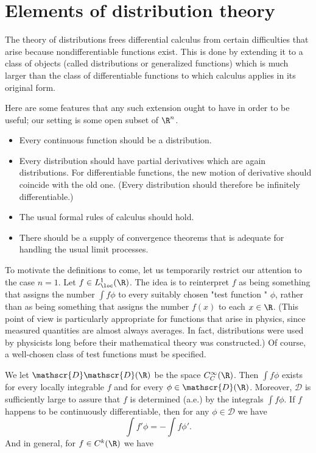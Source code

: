 \chapter{Elements of distribution theory}
The theory of distributions frees differential calculus from certain difficulties that arise because nondifferentiable functions exist. This is done by extending it to a class of objects (called distributions or generalized functions) which is much larger than the class of differentiable functions to which calculus applies in its original form.\par
Here are some features that any such extension ought to have in order to be useful; our setting is some open subset of $\R^n$.
\begin{itemize}
\item Every continuous function should be a distribution.
\item Every distribution should have partial derivatives which are again distributions. For differentiable functions, the new motion of derivative
should coincide with the old one. (Every distribution should therefore
be infinitely differentiable.)
\item The usual formal rules of calculus should hold.
\item There should be a supply of convergence theorems that is adequate for
handling the usual limit processes.
\end{itemize}
To motivate the definitions to come, let us temporarily restrict our attention to the case $n=1$. Let $f\in L^1_{\loc}(\R)$. The idea is to reinterpret $f$ as being something that assigns the number $\int f\phi$ to every suitably chosen "test function " $\phi$, rather than as being something that assigns the number $f(x)$ to each $x\in\R$. (This point of view is particularly appropriate for functions that arise in physics, since measured quantities are almost always averages. In fact, distributions were used by physicists long before their mathematical theory was constructed.) Of course, a well-chosen class of test functions must be specified.\par
We let $\mathscr{D}\mathscr{D}(\R)$ be the space $C^\infty_C(\R)$. Then $\int f\phi$ exists for every locally integrable $f$ and for every $\phi\in\mathscr{D}(\R)$. Moreover, $\mathscr{D}$ is sufficiently large to assure that $f$ is determined (a.e.) by the integrals $\int f\phi$. If $f$ happens to be continuously differentiable, then for any $\phi\in\mathscr{D}$ we have
\[\int f'\phi=-\int f\phi'.\]
And in general, for $f\in C^k(\R)$ we have
